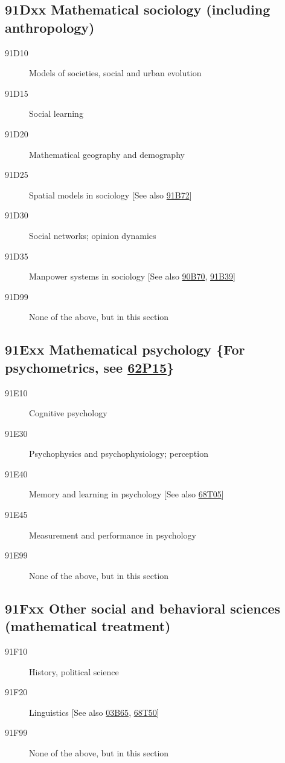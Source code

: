\documentclass[letterpaper]{article}
\begin{document}
\subsection*{91Dxx  Mathematical sociology (including anthropology) }\label{91Dxx}
\begin{description}  
\item [91D10]\label{91D10} Models of societies, social and urban evolution
\item [91D15]\label{91D15} Social learning
\item [91D20]\label{91D20} Mathematical geography and demography
\item [91D25]\label{91D25} Spatial models in sociology [See also \hyperref[91B72]{91B72}]
\item [91D30]\label{91D30} Social networks; opinion dynamics
\item [91D35]\label{91D35} Manpower systems in sociology [See also \hyperref[90B70]{90B70}, \hyperref[91B39]{91B39}]
\item [91D99]\label{91D99} None of the above, but in this section
\end{description}
\subsection*{91Exx  Mathematical psychology \{For psychometrics, see \hyperref[62P15]{62P15}\} }\label{91Exx}
\begin{description}  
\item [91E10]\label{91E10} Cognitive psychology
\item [91E30]\label{91E30} Psychophysics and psychophysiology; perception
\item [91E40]\label{91E40} Memory and learning in psychology [See also \hyperref[68T05]{68T05}]
\item [91E45]\label{91E45} Measurement and performance in psychology
\item [91E99]\label{91E99} None of the above, but in this section
\end{description}
\subsection*{91Fxx  Other social and behavioral sciences (mathematical treatment) }\label{91Fxx}
\begin{description}  
\item [91F10]\label{91F10} History, political science
\item [91F20]\label{91F20} Linguistics [See also \hyperref[03B65]{03B65}, \hyperref[68T50]{68T50}]
\item [91F99]\label{91F99} None of the above, but in this section
\end{description}
\end{document}
